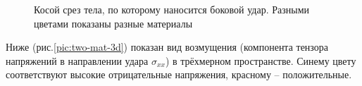 \begin{figure}[H]
\caption{Косой срез тела, по которому наносится боковой удар. Разными цветами показаны разные материалы}
\label{pic:two-materials}
\end{figure} 

Ниже (рис.\ref{pic:two-mat-3d}) показан вид возмущения (компонента тензора напряжений в направлении удара $\sigma_{xx}$) в трёхмерном пространстве. Синему цвету соответствуют высокие отрицательные напряжения, красному -- положительные.

